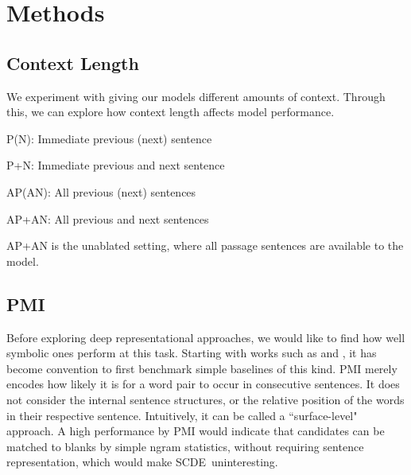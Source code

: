 \documentclass[11pt,a4paper]{article}
\newenvironment{tight_enumerate}{
\begin{enumerate}
  \setlength{\itemsep}{0pt}
  \setlength{\parskip}{0pt}
}{\end{enumerate}}
\newcommand{\dsname}{\textsc{SCDE}}
\begin{document}
\section{Methods}
\label{sec:methods}
\subsection{Context Length}
\label{sec:feature}
We experiment with giving our models different amounts of context. Through this, we can explore how context length affects model performance.
\vspace{-\topsep}
\begin{tight_enumerate}
  \setlength{\parskip}{0pt}
  \setlength{\itemsep}{0pt plus 1pt}
    \item \textsc{P(N)}: Immediate previous (next) sentence 
    \item \textsc{P+N}: Immediate previous and next sentence
    \item \textsc{AP(AN)}: All previous (next) sentences 
    \item \textsc{AP+AN}: All previous and next sentences
\end{tight_enumerate}
\vspace{-\topsep}
\textsc{AP+AN} is the unablated setting, where all passage sentences are available to the model.
\subsection{PMI} Before exploring deep representational approaches, we would like to find how well symbolic ones perform at this task. Starting with works such as  and , it has become convention to first benchmark simple baselines of this kind.  
PMI merely encodes how likely it is for a word pair to occur in consecutive sentences. It does not consider the internal sentence structures, or the relative position of the words in their respective sentence. Intuitively, it can be called a ``surface-level" approach. A high performance by PMI would indicate that candidates can be matched to blanks by simple ngram statistics, without requiring sentence representation, which would make \dsname~uninteresting.
\end{document}
